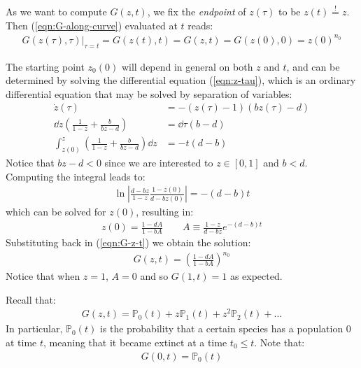 \documentclass[../../main.tex]{subfiles}
\begin{document}
\medskip

As we want to compute $G(z,t)$, we fix the \textit{endpoint} of $z(\tau)$ to be $z(t) \overset{!}{=} z$. Then (\ref{eqn:G-along-curve}) evaluated at $t$ reads:
\begin{align}\label{eqn:G-z-t}
    G(z(\tau), \tau) \Big|_{\tau = t} = G(z(t), t) = G(z, t) = G(z(0), 0) = z(0)^{n_0}
\end{align}

The starting point $z_0(0)$ will depend in general on both $z$ and $t$, and can be determined by solving the differential equation (\ref{eqn:z-tau}), which is an ordinary differential equation that may be solved by separation of variables:
\begin{align*}
    \dot{z}(\tau) &= - (z(\tau) - 1)(b z(\tau) - d)\\
    \dd{z} \left(\frac{1}{1-z} + \frac{b}{bz -d}  \right) &= \dd{\tau} (b-d)\\
    \int_{z(0)}^z \left(\frac{1}{1-z} + \frac{b}{bz -d}  \right)\dd{z} &= - t(d-b)
\end{align*}
Notice that $bz-d < 0$ since we are interested to $z \in [0,1]$ and $b < d$. Computing the integral leads to:
\begin{align*}
    \ln \left| \frac{d-bz}{1-z} \frac{1-z(0)}{d-bz(0)}  \right| = -(d-b) t
\end{align*}
which can be solved for $z(0)$, resulting in:
\begin{align*}
    z(0) = \frac{1 - dA}{1-bA} \qquad A \equiv \frac{1-z}{d-bz} e^{-(d-b)t}  
\end{align*}
Substituting back in (\ref{eqn:G-z-t}) we obtain the solution:
\begin{align}\label{eqn:extinction-generating}
    G(z,t) = \left(\frac{1-dA}{1-bA} \right)^{n_0}
\end{align}
Notice that when $z=1$, $A=0$ and so $G(1,t) = 1$ as expected.

\medskip

Recall that:
\begin{align*}
    G(z,t) = \mathbb{P}_0(t) + z \mathbb{P}_1(t) + z^2 \mathbb{P}_2(t) + \dots
\end{align*}
In particular, $\mathbb{P}_0(t)$ is the probability that a certain species has a population $0$ at time $t$, meaning that it became extinct at a time $t_0 \leq t$. Note that:
\begin{align*}
    G(0,t) = \mathbb{P}_0(t)
\end{align*}

\medskip
\end{document}
